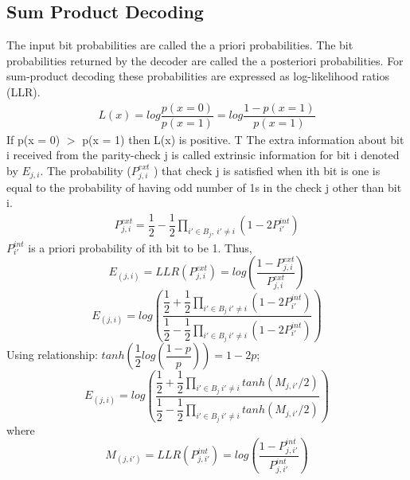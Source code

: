 \subsection{Sum Product Decoding\cite{9}}

The input bit probabilities are called the a priori probabilities.
The bit probabilities returned by the decoder are called the a posteriori probabilities.
For sum-product decoding these probabilities are expressed
as log-likelihood ratios (LLR).
\begin{align} L(x)=log\dfrac{p(x=0)}{p(x=1)}=log\dfrac{1-p(x=1)}{p(x=1)} \end{align}
 If p(x = 0) $>$ p(x = 1) then L(x) is positive.
T%
The extra information about bit i received
from the parity-check j is called extrinsic information for bit i denoted by $E_{j,i}$. The probability ($P_{j,i}^{ext}$ ) that check j is satisfied when ith bit is one is equal to the probability of having odd number of 1s in the check j other than bit i.
\begin{align} P_{j,i}^{ext} = \dfrac{1}{2}-\dfrac{1}{2} \prod_{i'\in B_j, \ i'\neq i }(1-2P_{i'}^{int})  \end{align}
$P_{i'}^{int}$ is a priori probability of ith bit to be 1. Thus,
\[ E_{(j,i)} =  LLR (P_{j,i}^{ext}) = log \left(
\dfrac{1-P_{j,i}^{ext}}{P_{j,i}^{ext}} 
\right)
\]
\[ E_{(j,i)} = log
\left(
\dfrac{\dfrac{1}{2}+\dfrac{1}{2} \prod_{i'\in B_j \ i'\neq i }(1-2P_{i'}^{int}) }{\dfrac{1}{2}-\dfrac{1}{2} \prod_{i'\in B_j \ i'\neq i }(1-2P_{i'}^{int}) } 
\right)
 \]
Using relationship: $tanh \left(  \dfrac{1}{2}log \left( \dfrac{1-p}{p} \right) \right)=1-2p$;
\[ E_{(j,i)} = log
\left(
\dfrac{\dfrac{1}{2}+\dfrac{1}{2} \prod_{i'\in B_j \ i'\neq i }tanh(M_{j,i'}/2) }{\dfrac{1}{2}-\dfrac{1}{2} \prod_{i'\in B_j \ i'\neq i }tanh(M_{j,i'}/2) } 
\right)
 \]
where 
\[ M_{(j,i')} =  LLR (P_{j,i'}^{int}) = log \left(
\dfrac{1-P_{j,i'}^{int}}{P_{j,i'}^{int}} 
\right)
\]
